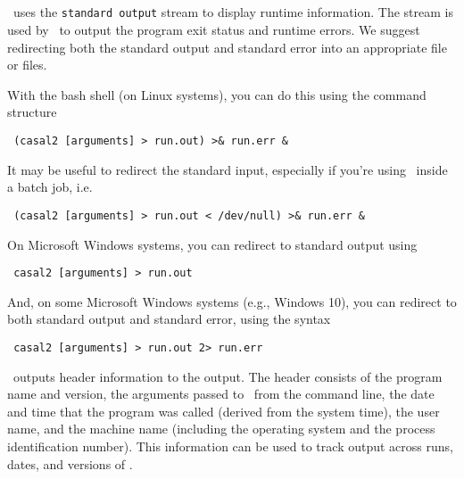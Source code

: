 \subsection{\label{sec:RedirectingStandardOut}}

\CNAME\ uses the \texttt{standard output} stream to display runtime information. The  stream is used by \CNAME\ to output the program exit status and runtime errors. We suggest redirecting both the standard output and standard error into an appropriate file or files.

With the bash shell (on Linux systems), you can do this using the command structure

\begin{verbatim} (casal2 [arguments] > run.out) >& run.err &\end{verbatim}

It may be useful to redirect the standard input, especially if you're using \CNAME\ inside a batch job, i.e.

\begin{verbatim} (casal2 [arguments] > run.out < /dev/null) >& run.err &\end{verbatim}

On Microsoft Windows systems, you can redirect to standard output using

\begin{verbatim} casal2 [arguments] > run.out\end{verbatim}

And, on some Microsoft Windows systems (e.g., Windows 10), you can redirect to both standard output and standard error, using the syntax

\begin{verbatim} casal2 [arguments] > run.out 2> run.err\end{verbatim}

\CNAME\ outputs header information to the output. The header consists of the program name and version, the arguments passed to \CNAME\ from the command line, the date and time that the program was called (derived from the system time), the user name, and the machine name (including the operating system and the process identification number). This information can be used to track output across runs, dates, and versions of \CNAME .

\vspace*{4mm}

